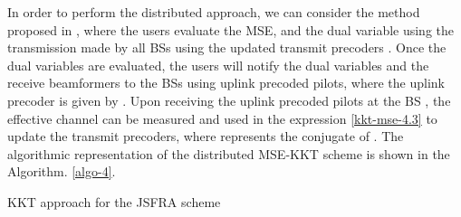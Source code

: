 In order to perform the distributed approach, we can consider the method proposed in \cite{komulainen2013effective}, where the users evaluate the \ac{MSE}, and the dual variable  using the transmission made by all \acp{BS} using the updated transmit precoders . Once the dual variables are evaluated, the users will notify the dual variables and the receive beamformers to the \acp{BS} using uplink precoded pilots, where the uplink precoder is given by . Upon receiving the uplink precoded pilots at the \ac{BS} , the effective channel  can be measured and used in the expression \eqref{kkt-mse-4.3} to update the transmit precoders, where  represents the conjugate of . The algorithmic representation of the distributed \ac{MSE}-\ac{KKT} scheme is shown in the Algorithm. \ref{algo-4}.
\begin{algorithm}
 \SetAlgoLined
 \DontPrintSemicolon
 \BlankLine
 \caption{\ac{KKT} approach for the \ac{JSFRA} scheme}
 \label{algo-4}
\end{algorithm}

